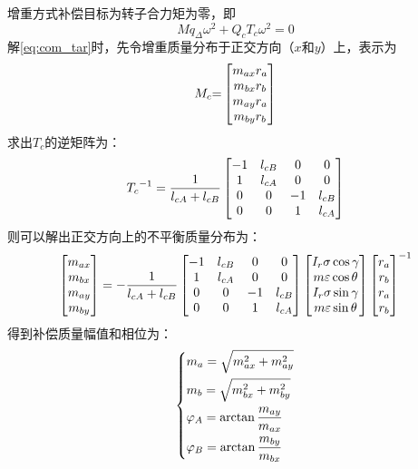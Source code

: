 增重方式补偿目标为转子合力矩为零，即
\begin{equation}
\label{eq:com_tar}
Mq_{\Delta}{\omega}^2 + Q_cT_c{\omega}^2 = 0
\end{equation}
解\autoref{eq:com_tar}时，先令增重质量分布于正交方向（$x$和$y$）上，表示为
\begin{equation}
{M_c}{\rm{ = }}\left[ {\begin{matrix}
   {{m_{ax}}{r_a}}  \cr 
   {{m_{bx}}{r_b}}  \cr 
   {{m_{ay}}{r_a}}  \cr 
   {{m_{by}}{r_b}}  \cr 

 \end{matrix} } \right]
\end{equation}
求出$T_c$的逆矩阵为：
\begin{equation}
{T_c}^{ - 1} = {1 \over {{l_{cA}} + {l_{cB}}}}\left[ {\begin{matrix}
   { - 1} & {{l_{cB}}} & 0 & 0  \cr 
   1 & {{l_{cA}}} & 0 & 0  \cr 
   0 & 0 & { - 1} & {{l_{cB}}}  \cr 
   0 & 0 & 1 & {{l_{cA}}}  \cr 

 \end{matrix} } \right]
\end{equation}
则可以解出正交方向上的不平衡质量分布为：
\begin{equation}
\left[ {\begin{matrix}
   {{m_{ax}}}  \cr 
   {{m_{bx}}}  \cr 
   {{m_{ay}}}  \cr 
   {{m_{by}}}  \cr 

 \end{matrix} } \right] =  - {1 \over {{l_{cA}} + {l_{cB}}}}\left[ {\begin{matrix}
   { - 1} & {{l_{cB}}} & 0 & 0  \cr 
   1 & {{l_{cA}}} & 0 & 0  \cr 
   0 & 0 & { - 1} & {{l_{cB}}}  \cr 
   0 & 0 & 1 & {{l_{cA}}}  \cr 

 \end{matrix} } \right]\left[ {\begin{matrix}
   {{I_r}\sigma \cos \gamma }  \cr 
   {m\varepsilon \cos \theta }  \cr 
   {{I_r}\sigma \sin \gamma }  \cr 
   {m\varepsilon \sin \theta }  \cr 

 \end{matrix} } \right]{\left[ {\begin{matrix}
   {{r_a}}  \cr 
   {{r_b}}  \cr 
   {{r_a}}  \cr 
   {{r_b}}  \cr 

 \end{matrix} } \right]^{ - 1}}
\end{equation}
得到补偿质量幅值和相位为：
\begin{equation}
\left\{
\begin{aligned}
&{m_a} = \sqrt {m_{ax}^2 + m_{ay}^2}\\
&{m_b} = \sqrt {m_{bx}^2 + m_{by}^2} \\  
&{\varphi _A} = \arctan {{{m_{ay}}} \over {{m_{ax}}}} \\
&{\varphi _B} = \arctan {{{m_{by}}} \over {{m_{bx}}}} \\ 
\end{aligned}
\right.
\end{equation}


